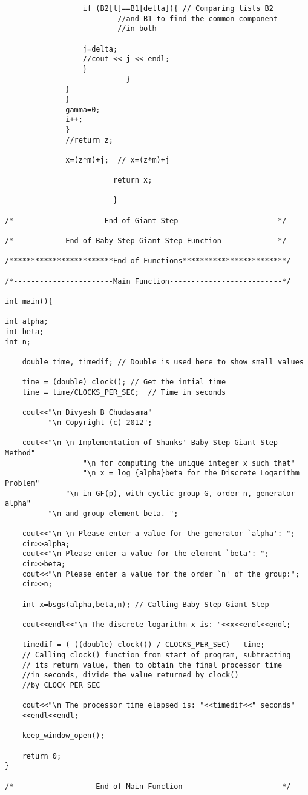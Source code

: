 \documentclass[iwp,first]{luthesis}
\begin{document}
\begin{verbatim}
                  if (B2[l]==B1[delta]){ // Comparing lists B2 
		                  //and B1 to find the common component 
		                  //in both

                  j=delta;
                  //cout << j << endl;
                  }
                            }
              }
              }
              gamma=0;
              i++;
              }
              //return z;
              
              x=(z*m)+j;  // x=(z*m)+j    
              
                         return x;
              
                         }                        

/*---------------------End of Giant Step-----------------------*/

/*------------End of Baby-Step Giant-Step Function-------------*/

/************************End of Functions************************/

/*-----------------------Main Function--------------------------*/

int main(){
    
int alpha;
int beta;
int n;

    double time, timedif; // Double is used here to show small values

    time = (double) clock(); // Get the intial time
    time = time/CLOCKS_PER_SEC;  // Time in seconds 
    
    cout<<"\n Divyesh B Chudasama"
          "\n Copyright (c) 2012";
          
    cout<<"\n \n Implementation of Shanks' Baby-Step Giant-Step Method" 
		          "\n for computing the unique integer x such that" 
		          "\n x = log_{alpha}beta for the Discrete Logarithm Problem" 
	          "\n in GF(p), with cyclic group G, order n, generator alpha"
          "\n and group element beta. ";
             
    cout<<"\n \n Please enter a value for the generator `alpha': ";
    cin>>alpha;
    cout<<"\n Please enter a value for the element `beta': ";
    cin>>beta;
    cout<<"\n Please enter a value for the order `n' of the group:";
    cin>>n;
    
    int x=bsgs(alpha,beta,n); // Calling Baby-Step Giant-Step
    
    cout<<endl<<"\n The discrete logarithm x is: "<<x<<endl<<endl;
    
    timedif = ( ((double) clock()) / CLOCKS_PER_SEC) - time; 
    // Calling clock() function from start of program, subtracting 
    // its return value, then to obtain the final processor time 
    //in seconds, divide the value returned by clock() 
    //by CLOCK_PER_SEC
    
    cout<<"\n The processor time elapsed is: "<<timedif<<" seconds"
    <<endl<<endl;
    
    keep_window_open();
    
    return 0;
}       
    
/*-------------------End of Main Function-----------------------*/    

\end{verbatim}
\end{document}
